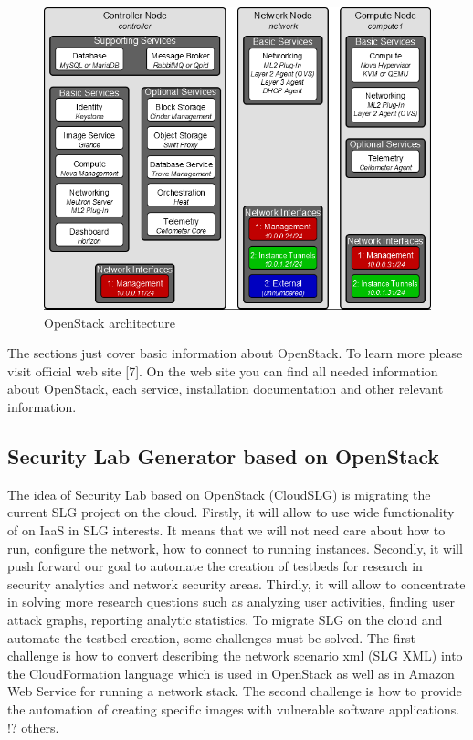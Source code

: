 \begin{figure}[ht!]
\centering
\includegraphics[width=\textwidth]{openstack_architecture.png}
\caption{OpenStack architecture}
\label{overflow}
\end{figure}

The sections just cover basic information about OpenStack. To learn more please visit official web site [7]. On the web site you can find all needed information about OpenStack, each service, installation documentation and other relevant information. 


\subsection{Security Lab Generator based on OpenStack}
The idea of Security Lab based on OpenStack (CloudSLG) is migrating the current SLG project on the cloud. Firstly, it will allow to use wide functionality of on IaaS in SLG interests. It means that we will not need care about how to run, configure the network, how to connect to running instances. Secondly, it will push forward our goal to automate the creation of testbeds for research in security analytics and network security areas. Thirdly, it will allow to concentrate in solving more research questions such as analyzing user activities, finding user attack graphs, reporting analytic statistics. To migrate SLG on the cloud and automate the testbed creation, some challenges must be solved. The first challenge is how to convert describing the network scenario xml (SLG XML) into the CloudFormation language which is used in OpenStack as well as in Amazon Web Service for running a network stack. The second challenge is how to provide the automation of creating specific images with vulnerable software applications. !? others.  



% 